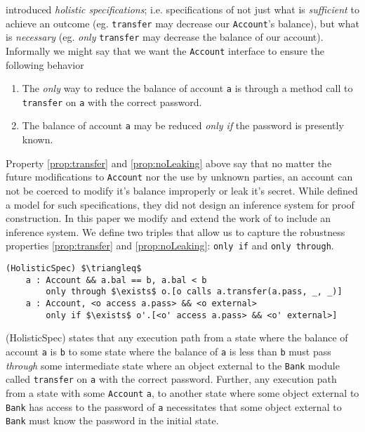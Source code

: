 \documentclass[acmsmall,review,anonymous]{acmart}\settopmatter{printfolios=true,printccs=false,printacmref=false}
\begin{document}
\citeauthor{FASE} introduced \emph{holistic specifications}; i.e. specifications of
not just what is \emph{sufficient} to achieve an outcome (eg. \texttt{transfer} may 
decrease our \texttt{Account}'s balance), but what is \emph{necessary} (eg. \emph{only} 
\texttt{transfer} may decrease the balance of our account). Informally we might say 
that we want the \texttt{Account} interface to ensure the following behavior
\begin{enumerate}
\item
\label{prop:transfer}
The \emph{only} way to reduce the balance of account \texttt{a} is through a method call
to \texttt{transfer} on \texttt{a} with the correct password.
\item
\label{prop:noLeaking}
The balance of account \texttt{a} may be reduced \emph{only if} the password is presently
known.
\end{enumerate}
Property \ref{prop:transfer} and \ref{prop:noLeaking} above say that no matter the 
future modifications to \texttt{Account} nor the use by unknown parties, an account 
can not be coerced to modify it's balance improperly or leak it's secret. While 
\citeauthor{FASE} defined a model for such specifications, they did not design an
inference system for proof construction. In this paper we modify and extend the work of 
\citeauthor{FASE} to include an inference system. We define two triples that allow us to
capture the robustness properties \ref{prop:transfer} and \ref{prop:noLeaking}: \texttt{only if}
and \texttt{only through}.
\begin{lstlisting}[mathescape=true]
(HolisticSpec) $\triangleq$
	a : Account && a.bal == b, a.bal < b 
		only through $\exists$ o.[o calls a.transfer(a.pass, _, _)]
	a : Account, <o access a.pass> && <o external> 
		only if $\exists$ o'.[<o' access a.pass> && <o' external>]
\end{lstlisting}
(HolisticSpec) states that any execution path from a state where the balance of account \texttt{a}
is \texttt{b} to some state where the balance of \texttt{a} is less than \texttt{b} 
must pass \emph{through} some intermediate state where an object external to the \texttt{Bank} module 
called \texttt{transfer} on \texttt{a} with the correct password. Further, any execution
path from a state with some \texttt{Account} \texttt{a}, to another state where some object external 
to \texttt{Bank} has access to the password of \texttt{a} necessitates that some object external to 
\texttt{Bank} must know the password in the initial state.
\end{document}
